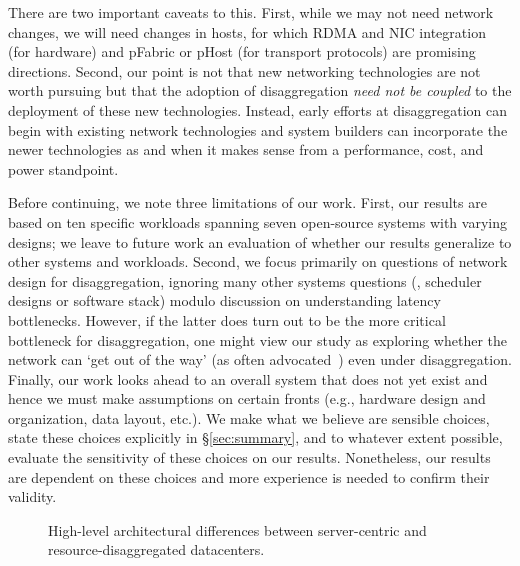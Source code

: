 There are two important caveats to this.  First, while we may not need network changes, we will need changes in hosts, for which RDMA and NIC integration (for hardware) and pFabric or pHost (for transport protocols) are promising directions. Second, our point is not that new networking technologies are not worth pursuing but that the adoption of disaggregation \emph{need not be coupled} to the deployment of these new technologies. Instead, early efforts at disaggregation can begin with existing network technologies and system builders can incorporate the newer technologies as and when it makes sense from a performance, cost, and power standpoint.

Before continuing, we note three limitations of our work. First, our results are based on ten specific workloads spanning seven open-source systems with varying designs; we leave to future work an evaluation of whether our results generalize to other systems and workloads.
Second, we focus primarily on questions of network design for disaggregation, ignoring many other systems questions (\eg, scheduler designs or software stack) modulo discussion on understanding latency bottlenecks. However, if the latter does turn out to be the more critical bottleneck for disaggregation, one might view our study as exploring whether the network can `get out of the way' (as often advocated~\cite{greenberg-sigcomm15}) even under disaggregation. Finally, our work looks ahead to an overall system that does not yet exist and hence we must make assumptions on certain fronts (e.g., hardware design and organization, data layout, etc.). We make what we believe are sensible choices, state these choices explicitly in \S\ref{sec:summary}, and to whatever extent possible, evaluate the sensitivity of these choices on our results. Nonetheless, our results are dependent on these choices and more experience is needed to confirm their validity.

\begin{figure}[!h]
\centering 
{}
{}
\caption{High-level architectural differences between server-centric and resource-disaggregated datacenters.}
\label{fig:dc}
\end{figure}